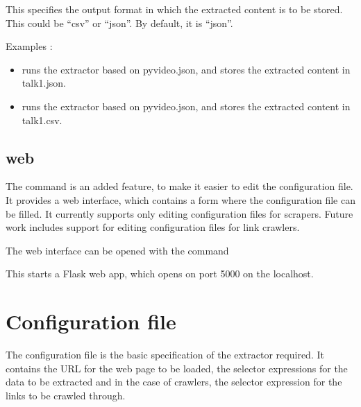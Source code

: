 \documentclass[letterpaper,12pt,english]{sphinxmanual}
\begin{document}
This specifies the output format in which the extracted content is to be stored. This could be ``csv'' or ``json''. By default, it is ``json''.

Examples :
\begin{itemize}
\item {} 
 runs the extractor based on pyvideo.json, and stores the extracted content in talk1.json.

\item {} 
 runs the extractor based on pyvideo.json, and stores the extracted content in talk1.csv.

\end{itemize}


\subsection{web}
\label{framework/commands:web}\label{framework/commands:command-web}
The  command is an added feature, to make it easier to edit the configuration file. It provides a web interface, which contains a form where the configuration file can be filled. It currently supports only editing configuration files for scrapers. Future work includes support for editing configuration files for link crawlers.

The web interface can be opened with the command


This starts a Flask web app, which opens on port 5000 on the localhost.


\section{Configuration file}
\label{framework/config:configuration-file}\label{framework/config::doc}\label{framework/config:framework-config}
The configuration file is the basic specification of the extractor required. It contains the URL for the web page to be loaded, the selector expressions for the data to be extracted and in the case of crawlers, the selector expression for the links to be crawled through.
\end{document}
